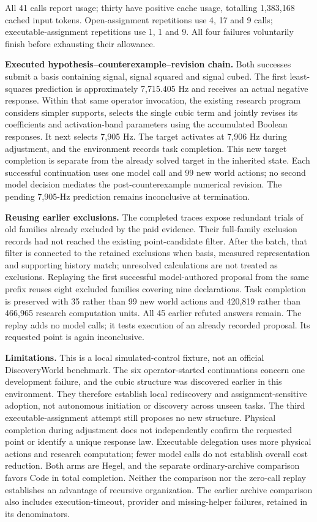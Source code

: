 \documentclass[11pt,a4paper]{article}
\begin{document}
All 41 calls report usage; thirty have positive cache usage, totalling 1,383,168 cached input tokens. Open-assignment repetitions use 4, 17 and 9 calls; executable-assignment repetitions use 1, 1 and 9. All four failures voluntarily finish before exhausting their allowance.


\textbf{Executed hypothesis–counterexample–revision chain.} Both successes submit a basis containing signal, signal squared and signal cubed. The first least-squares prediction is approximately 7,715.405 Hz and receives an actual negative response. Within that same operator invocation, the existing research program considers simpler supports, selects the single cubic term and jointly revises its coefficients and activation-band parameters using the accumulated Boolean responses. It next selects 7,905 Hz. The target activates at 7,906 Hz during adjustment, and the environment records task completion. This new target completion is separate from the already solved target in the inherited state. Each successful continuation uses one model call and 99 new world actions; no second model decision mediates the post-counterexample numerical revision. The pending 7,905-Hz prediction remains inconclusive at termination.


\textbf{Reusing earlier exclusions.} The completed traces expose redundant trials of old families already excluded by the paid evidence. Their full-family exclusion records had not reached the existing point-candidate filter. After the batch, that filter is connected to the retained exclusions when basis, measured representation and supporting history match; unresolved calculations are not treated as exclusions. Replaying the first successful model-authored proposal from the same prefix reuses eight excluded families covering nine declarations. Task completion is preserved with 35 rather than 99 new world actions and 420,819 rather than 466,965 research computation units. All 45 earlier refuted answers remain. The replay adds no model calls; it tests execution of an already recorded proposal. Its requested point is again inconclusive.


\textbf{Limitations.} This is a local simulated-control fixture, not an official DiscoveryWorld benchmark. The six operator-started continuations concern one development failure, and the cubic structure was discovered earlier in this environment. They therefore establish local rediscovery and assignment-sensitive adoption, not autonomous initiation or discovery across unseen tasks. The third executable-assignment attempt still proposes no new structure. Physical completion during adjustment does not independently confirm the requested point or identify a unique response law. Executable delegation uses more physical actions and research computation; fewer model calls do not establish overall cost reduction. Both arms are Hegel, and the separate ordinary-archive comparison favors Code in total completion. Neither the comparison nor the zero-call replay establishes an advantage of recursive organization. The earlier archive comparison also includes execution-timeout, provider and missing-helper failures, retained in its denominators.
\end{document}
